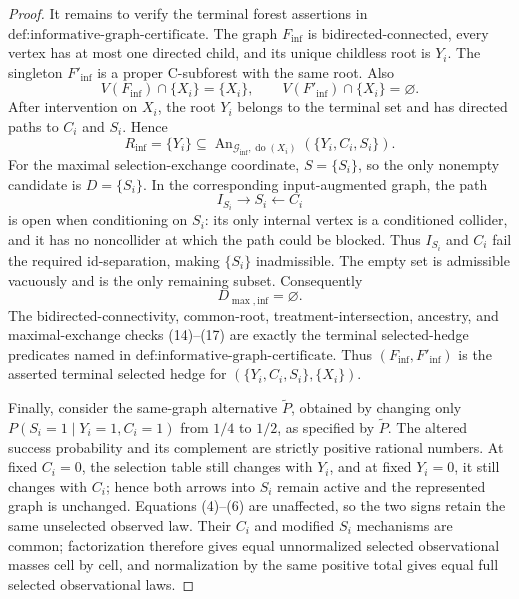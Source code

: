 \documentclass{article}
\begin{document}
\begin{proof}
It remains to verify the terminal forest assertions in \(\text{def:informative-graph-certificate}\).  The graph \(F_{\mathrm{inf}}\) is bidirected-connected, every vertex has at most one directed child, and its unique childless root is \(Y_i\).  The singleton \(F'_{\mathrm{inf}}\) is a proper C-subforest with the same root.  Also
\[
 V(F_{\mathrm{inf}})\cap\{X_i\}=\{X_i\},
 \qquad
 V(F'_{\mathrm{inf}})\cap\{X_i\}=\varnothing.          \tag{14}
\]
After intervention on \(X_i\), the root \(Y_i\) belongs to the terminal set and has directed paths to \(C_i\) and \(S_i\).  Hence
\[
 R_{\mathrm{inf}}=\{Y_i\}
 \subseteq\operatorname{An}_{\mathcal G_{\mathrm{inf}},\operatorname{do}(X_i)}
 (\{Y_i,C_i,S_i\}).                                     \tag{15}
\]
For the maximal selection-exchange coordinate, \(S=\{S_i\}\), so the only nonempty candidate is \(D=\{S_i\}\).  In the corresponding input-augmented graph, the path
\[
 I_{S_i}\longrightarrow S_i\longleftarrow C_i           \tag{16}
\]
is open when conditioning on \(S_i\): its only internal vertex is a conditioned collider, and it has no noncollider at which the path could be blocked.  Thus \(I_{S_i}\) and \(C_i\) fail the required id-separation, making \(\{S_i\}\) inadmissible.  The empty set is admissible vacuously and is the only remaining subset.  Consequently
\[
 D_{\max,\mathrm{inf}}=\varnothing.                     \tag{17}
\]
The bidirected-connectivity, common-root, treatment-intersection, ancestry, and maximal-exchange checks (14)--(17) are exactly the terminal selected-hedge predicates named in \(\text{def:informative-graph-certificate}\).  Thus \((F_{\mathrm{inf}},F'_{\mathrm{inf}})\) is the asserted terminal selected hedge for \((\{Y_i,C_i,S_i\},\{X_i\})\).

Finally, consider the same-graph alternative \(\widetilde P\), obtained by changing only \(P(S_i=1\mid Y_i=1,C_i=1)\) from \(1/4\) to \(1/2\), as specified by \(\widetilde P\).  The altered success probability and its complement are strictly positive rational numbers.  At fixed \(C_i=0\), the selection table still changes with \(Y_i\), and at fixed \(Y_i=0\), it still changes with \(C_i\); hence both arrows into \(S_i\) remain active and the represented graph is unchanged.  Equations (4)--(6) are unaffected, so the two signs retain the same unselected observed law.  Their \(C_i\) and modified \(S_i\) mechanisms are common; factorization therefore gives equal unnormalized selected observational masses cell by cell, and normalization by the same positive total gives equal full selected observational laws.


\end{proof}
\end{document}
